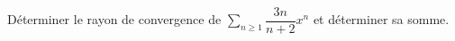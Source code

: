 \documentclass[a4paper,10pt]{report}
\newcommand{\Sum}[2]{\ensuremath{\textstyle{\sum\limits_{#1}^{#2}}}}
\begin{document}

\begin{Exa} Déterminer le rayon de convergence de $\Sum{n\geq 1}{} \dfrac{3n}{n+2} x^n$ et déterminer sa somme.
\end{Exa}

\end{document}

